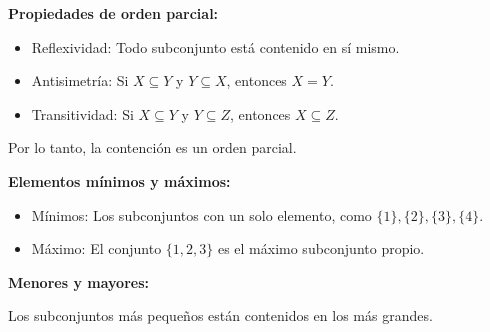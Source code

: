 \begin{solution}
\begin{enumerate}
        \textbf{Propiedades de orden parcial:}
        \begin{itemize}
            \item Reflexividad: Todo subconjunto está contenido en sí mismo.
            \item Antisimetría: Si \( X \subseteq Y \) y \( Y \subseteq X \), entonces \( X = Y \).
            \item Transitividad: Si \( X \subseteq Y \) y \( Y \subseteq Z \), entonces \( X \subseteq Z \).
        \end{itemize}
        
        Por lo tanto, la contención es un orden parcial.
        
        
        
        \textbf{Elementos mínimos y máximos:}
        \begin{itemize}
            \item Mínimos: Los subconjuntos con un solo elemento, como \( \{1\}, \{2\}, \{3\}, \{4\} \).
            \item Máximo: El conjunto \( \{1, 2, 3\} \) es el máximo subconjunto propio.
        \end{itemize}
        
        \textbf{Menores y mayores:}
        
        Los subconjuntos más pequeños están contenidos en los más grandes.
    \end{enumerate}
\end{solution}
